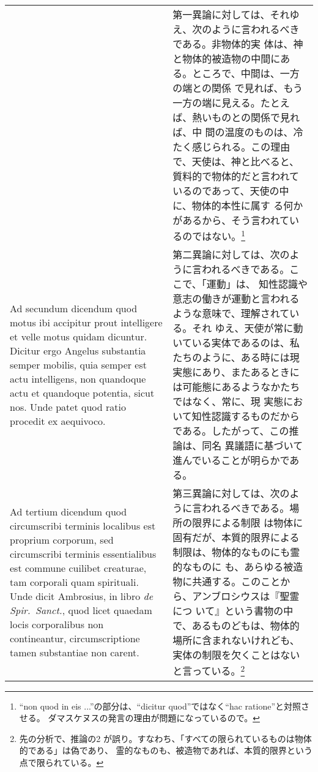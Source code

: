 \documentclass[10pt]{jsarticle} %
\begin{document}
\begin{longtable}{p{21em}p{21em}}
&

第一異論に対しては、それゆえ、次のように言われるべきである。非物体的実
体は、神と物体的被造物の中間にある。ところで、中間は、一方の端との関係
で見れば、もう一方の端に見える。たとえば、熱いものとの関係で見れば、中
間の温度のものは、冷たく感じられる。この理由で、天使は、神と比べると、
質料的で物体的だと言われているのであって、天使の中に、物体的本性に属す
る何かがあるから、そう言われているのではない。\footnote{ ``non quod in
eis ...''の部分は、``dicitur quod''ではなく``hac ratione''と対照させる。
ダマスケヌスの発言の理由が問題になっているので。}
 
\\

Ad secundum dicendum quod motus ibi accipitur prout intelligere et
velle motus quidam dicuntur. Dicitur ergo Angelus substantia semper
mobilis, quia semper est actu intelligens, non quandoque actu et
quandoque potentia, sicut nos. Unde patet quod ratio procedit ex
aequivoco.

&

第二異論に対しては、次のように言われるべきである。ここで、「運動」は、
知性認識や意志の働きが運動と言われるような意味で、理解されている。それ
ゆえ、天使が常に動いている実体であるのは、私たちのように、ある時には現
実態にあり、またあるときには可能態にあるようなかたちではなく、常に、現
実態において知性認識するものだからである。したがって、この推論は、同名
異議語に基づいて進んでいることが明らかである。

\\

Ad tertium dicendum quod circumscribi terminis localibus est proprium
corporum, sed circumscribi terminis essentialibus est commune cuilibet
creaturae, tam corporali quam spirituali. Unde dicit Ambrosius, in
libro {\itshape de Spir.~Sanct.}, quod licet quaedam locis
corporalibus non contineantur, circumscriptione tamen substantiae non
carent.

&

第三異論に対しては、次のように言われるべきである。場所の限界による制限
は物体に固有だが、本質的限界による制限は、物体的なものにも霊的なものに
も、あらゆる被造物に共通する。このことから、アンブロシウスは『聖霊につ
いて』という書物の中で、あるものどもは、物体的場所に含まれないけれども、
実体の制限を欠くことはないと言っている。\footnote{先の分析で、推論の2
が誤り。すなわち、「すべての限られているものは物体的である」は偽であり、
霊的なものも、被造物であれば、本質的限界という点で限られている。}

\end{longtable}
\newpage
\end{document}

